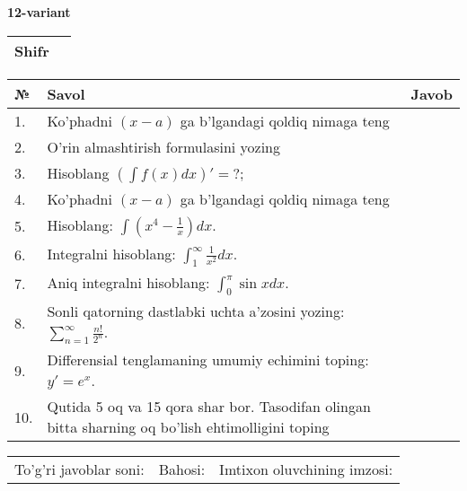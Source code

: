 \documentclass{article}
\begin{document}
  \egroup
  
  \newpage
  
  
  \textbf{12-variant}\\
  
  \bgroup
  \def\arraystretch{1.6} %
  
  \begin{tabular}{|m{5.7cm}|m{9.5cm}|}
  \hline
  Shifr & \\
  \hline
  \end{tabular}
  
  \vspace{1cm}
  
  \begin{tabular}{|m{0.7cm}|m{10cm}|m{4cm}|}
  \hline
  № & Savol & Javob \\
  \hline
  1. & Ko'phadni \((x - a)\) ga b'lgandagi qoldiq nimaga teng &  \\
  \hline
  2. & O'rin almashtirish formulasini yozing &  \\
  \hline
  3. & Hisoblang \(\left( \int {f(x)dx} \right)' = ?\); &  \\
  \hline
  4. & Ko'phadni \((x - a)\) ga b'lgandagi qoldiq nimaga teng &  \\
  \hline
  5. & Hisoblang: \(\int \left( x^{4} - \frac{1}{x} \right)dx\). &  \\
  \hline
  6. & Integralni hisoblang: \(\int_{1}^{\infty}{\frac{1}{x^{2}}dx}\). &  \\
  \hline
  7. & Aniq integralni hisoblang: \(\int_{0}^{\pi}{\sin xdx}\). &  \\
  \hline
  8. & Sonli qatorning dastlabki uchta a'zosini yozing: \(\sum_{n = 1}^{\infty}\frac{n!}{2^{n}}\). &  \\
  \hline
  9. & Differensial tenglamaning umumiy echimini toping: \(y' = e^{x}\). &  \\
  \hline
  10. & Qutida 5 oq va 15 qora shar bor. Tasodifan olingan bitta sharning oq bo'lish ehtimolligini toping &  \\
  \hline
  \end{tabular}
  
  \vspace{1cm}
  
  \begin{tabular}{lll}
  To'g'ri javoblar soni: \underline{\hspace{1.5cm}} & 
  Bahosi: \underline{\hspace{1.5cm}} & 
  Imtixon oluvchining imzosi: \underline{\hspace{2cm}} \\
  \end{tabular}
  
\end{document}
